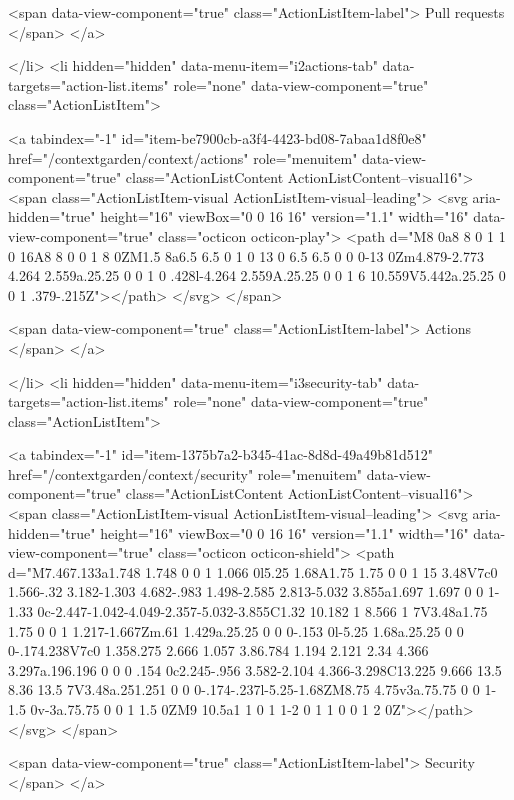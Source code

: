        <span data-view-component="true" class="ActionListItem-label">
          Pull requests
</span>      
</a>
  
</li>
        <li hidden="hidden" data-menu-item="i2actions-tab" data-targets="action-list.items" role="none" data-view-component="true" class="ActionListItem">
    
    
    <a tabindex="-1" id="item-be7900cb-a3f4-4423-bd08-7abaa1d8f0e8" href="/contextgarden/context/actions" role="menuitem" data-view-component="true" class="ActionListContent ActionListContent--visual16">
        <span class="ActionListItem-visual ActionListItem-visual--leading">
          <svg aria-hidden="true" height="16" viewBox="0 0 16 16" version="1.1" width="16" data-view-component="true" class="octicon octicon-play">
    <path d="M8 0a8 8 0 1 1 0 16A8 8 0 0 1 8 0ZM1.5 8a6.5 6.5 0 1 0 13 0 6.5 6.5 0 0 0-13 0Zm4.879-2.773 4.264 2.559a.25.25 0 0 1 0 .428l-4.264 2.559A.25.25 0 0 1 6 10.559V5.442a.25.25 0 0 1 .379-.215Z"></path>
</svg>
        </span>
      
        <span data-view-component="true" class="ActionListItem-label">
          Actions
</span>      
</a>
  
</li>
        <li hidden="hidden" data-menu-item="i3security-tab" data-targets="action-list.items" role="none" data-view-component="true" class="ActionListItem">
    
    
    <a tabindex="-1" id="item-1375b7a2-b345-41ac-8d8d-49a49b81d512" href="/contextgarden/context/security" role="menuitem" data-view-component="true" class="ActionListContent ActionListContent--visual16">
        <span class="ActionListItem-visual ActionListItem-visual--leading">
          <svg aria-hidden="true" height="16" viewBox="0 0 16 16" version="1.1" width="16" data-view-component="true" class="octicon octicon-shield">
    <path d="M7.467.133a1.748 1.748 0 0 1 1.066 0l5.25 1.68A1.75 1.75 0 0 1 15 3.48V7c0 1.566-.32 3.182-1.303 4.682-.983 1.498-2.585 2.813-5.032 3.855a1.697 1.697 0 0 1-1.33 0c-2.447-1.042-4.049-2.357-5.032-3.855C1.32 10.182 1 8.566 1 7V3.48a1.75 1.75 0 0 1 1.217-1.667Zm.61 1.429a.25.25 0 0 0-.153 0l-5.25 1.68a.25.25 0 0 0-.174.238V7c0 1.358.275 2.666 1.057 3.86.784 1.194 2.121 2.34 4.366 3.297a.196.196 0 0 0 .154 0c2.245-.956 3.582-2.104 4.366-3.298C13.225 9.666 13.5 8.36 13.5 7V3.48a.251.251 0 0 0-.174-.237l-5.25-1.68ZM8.75 4.75v3a.75.75 0 0 1-1.5 0v-3a.75.75 0 0 1 1.5 0ZM9 10.5a1 1 0 1 1-2 0 1 1 0 0 1 2 0Z"></path>
</svg>
        </span>
      
        <span data-view-component="true" class="ActionListItem-label">
          Security
</span>      
</a>
  
